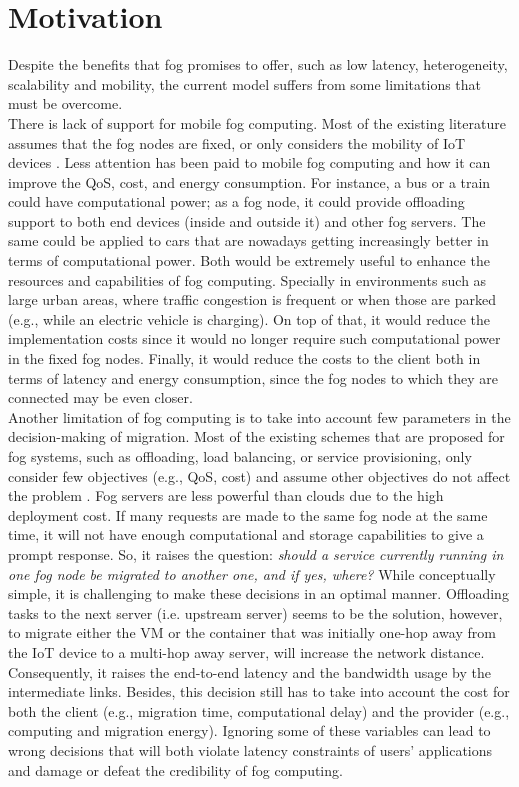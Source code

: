 \section{Motivation}\label{subsec:Motivation}
Despite the benefits that fog promises to offer, such as low latency, heterogeneity, scalability and mobility, the current model suffers from some limitations that must be overcome.\\
\noindent\tab There is lack of support for mobile fog computing. Most of the existing literature assumes that the fog nodes are fixed, or only considers the mobility of IoT devices \cite{yousefpour2018all}. Less attention has been paid to mobile fog computing and how it can improve the QoS, cost, and energy consumption. For instance, a bus or a train could have computational power; as a fog node, it could provide offloading support to both end devices (inside and outside it) and other fog servers. The same could be applied to cars that are nowadays getting increasingly better in terms of computational power. Both would be extremely useful to enhance the resources and capabilities of fog computing. Specially in environments such as large urban areas, where traffic congestion is frequent or when those are parked (e.g., while an electric vehicle is charging). On top of that, it would reduce the implementation costs since it would no longer require such computational power in the fixed fog nodes. Finally, it would reduce the costs to the client both in terms of latency and energy consumption, since the fog nodes to which they are connected may be even closer.\\
\noindent\tab Another limitation of fog computing is to take into account few parameters in the decision-making of migration. Most of the existing schemes that are proposed for fog systems, such as offloading, load balancing, or service provisioning, only consider few objectives (e.g., QoS, cost) and assume other objectives do not affect the problem \cite{yousefpour2018all}. Fog servers are less powerful than clouds due to the high deployment cost. If many requests are made to the same fog node at the same time, it will not have enough computational and storage capabilities to give a prompt response. So, it raises the question: \textit{should a service currently running in one fog node be migrated to another one, and if yes, where?} While conceptually simple, it is challenging to make these decisions in an optimal manner. Offloading tasks to the next server (i.e. upstream server) seems to be the solution, however, to migrate either the VM or the container that was initially one-hop away from the IoT device to a multi-hop away server, will increase the network distance. Consequently, it raises the end-to-end latency and the bandwidth usage by the intermediate links. Besides, this decision still has to take into account the cost for both the client (e.g., migration time, computational delay) and the provider (e.g., computing and migration energy). Ignoring some of these variables can lead to wrong decisions that will both violate latency constraints of users' applications and damage or defeat the credibility of fog computing.
